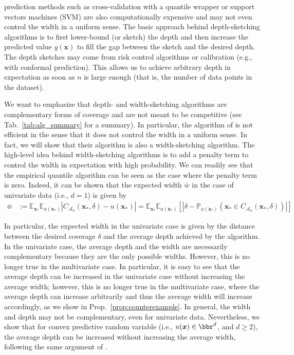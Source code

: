 \documentclass{article} %
\theoremstyle{remark}
\theoremstyle{definition}      %
\begin{document}
prediction methods such as cross-validation with a quantile wrapper \citep[see, e.g., ][]{papadopoulos2002inductive} or support vectors machines (SVM) \citep[see, e.g., ][]{shafer2008tutorial} are also computationally expensive and may not even control the width in a uniform sense. The basic approach behind depth-sketching algorithms is to first lower-bound (or sketch) the depth and then increase the predicted value $g(\bm{x})$ to fill the gap between the sketch and the desired depth. The depth sketches may come from risk control algorithms or calibration (e.g., with conformal prediction). This allows us to achieve arbitrary depth in expectation as soon as $n$ is large enough (that is, the number of data points in the dataset). 

We want to emphasize that depth- and width-sketching algorithms are complementary forms of coverage and are not meant to be competitive (see Tab.~\ref{tab:alg_summary} for a summary). In particular, the algorithm of \cite{angelopoulos2024conformal} is not efficient in the sense that it does not control the width in a uniform sense. In fact, we will show that their algorithm is also a width-sketching algorithm.
The high-level idea behind width-sketching algorithms is to add a penalty term to control the width in expectation with high probability. 
We can readily see that the empirical quantile algorithm can be seen as the case where the penalty term is zero. Indeed, it can be shown \citep[Sec. 13.3.1 in][]{shao2003mathematical} that the expected width $\bar{w}$ in the case of univariate data (i.e., $d=1$) is given by
\begin{equation} \label{eq:width_bias}
\begin{split}
  \bar{w} &:= \mathbb{E}_{\bm{x}_*} \mathbb{E}_{u(\bm{x_*})} | C_{\mathcal{A}_{n}}(\bm{x_*},\delta) - u(\bm{x_*})|  = \mathbb{E}_{\bm{x}_*} \mathbb{E}_{u(\bm{x_*})}[|\delta - \mathbb{P}_{u(\bm{x_*})}(\bm{x_*} \in C_{\mathcal{A}_{n}}(\bm{x_*},\delta))|]
\end{split}
\end{equation}

In particular, the expected width in the univariate case is given by the distance between the desired coverage $\delta$ and the average depth achieved by the algorithm.  In the univariate case, the average depth and the width are necessarily complementary because they are the only possible widths. However, this is no longer true in the multivariate case. In particular, it is easy to see that the average depth can be increased in the univariate case without increasing the average width; however, this is no longer true in the multivariate case, where the average depth can increase arbitrarily and thus the average width will increase accordingly, as we show in Prop.~\ref{prop:counterexample}.  In general, the width and depth may not be complementary, even for univariate data. Nevertheless, we show that for convex predictive random variable (i.e., $u(\bm{x}) \in \bbr^{d}$, and $d \geq 2$), the average depth can be increased without increasing the average width, following the same argument of \cite{angelopoulos2024conformal}.
\end{document}
